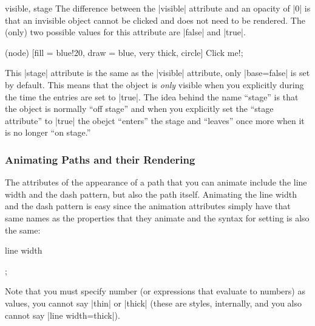 \begin{tikzanimateattribute}{visible, stage}
  The difference between the |visible| attribute and an opacity of |0| is
  that an invisible object cannot be clicked and does not need to be
  rendered. The (only) two possible values for this attribute are
  |false| and |true|.

\begin{codeexample}[animation list={1,2,3,4}]
\tikz [animate me = { :visible = { begin on=click, 0s="false", 2s="false"}}]
  \node (node) [fill = blue!20, draw = blue, very thick, circle] {Click me!}; 
\end{codeexample}

  This |stage| attribute is the same as the |visible| attribute, only
  |base=false| is set by default. This means that the object is
  \emph{only} visible when you explicitly during the time the entries
  are set to |true|. The idea behind the name ``stage'' is that the
  object is normally ``off stage'' and when you explicitly set the
  ``stage attribute'' to |true| the obejct ``enters'' the stage and
  ``leaves'' once more when it is no longer ``on stage.''
  
\begin{codeexample}[animation list={-1,0,1,2,3},animation bb={(1.3,-0.7) rectangle (2.7,0.7)}]
\end{codeexample}
\end{tikzanimateattribute}




\subsubsection{Animating Paths and their Rendering}
\label{section-animation-paths}

The attributes of the appearance of a path that you can animate
include the line width and the dash pattern, but also the path
itself. Animating the line width and the dash pattern is easy since
the animation attributes simply have that same names as the properties
that they animate and the syntax for setting is also the same:

\begin{tikzanimateattribute}{line width}
\begin{codeexample}[animation list={0.5,1,1.5,2}]
\tikz {}; 
\end{codeexample}
  Note that you must specify number (or expressions that evaluate to
  numbers) as values, you cannot say |thin| or |thick| (these are
  styles, internally, and you also cannot say |line width=thick|).
\end{tikzanimateattribute}


